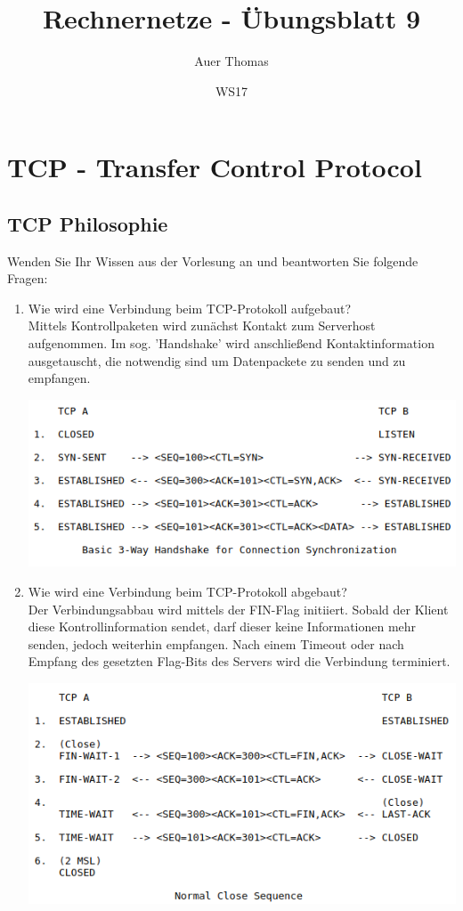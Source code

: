 \documentclass[11pt]{article}
\title{Rechnernetze - Übungsblatt 9}
\author{Auer Thomas}    %
\date{WS17}
\begin{document}
    \section{TCP - Transfer Control Protocol}
    \subsection{TCP Philosophie}
    Wenden Sie Ihr Wissen aus der Vorlesung an und beantworten Sie folgende Fragen:
    \begin{enumerate}[$\bullet$]
        \item Wie wird eine Verbindung beim TCP-Protokoll aufgebaut?\\
        Mittels Kontrollpaketen wird zunächst Kontakt zum Serverhost aufgenommen.
        Im sog. 'Handshake' wird anschließend Kontaktinformation ausgetauscht, die notwendig sind um Datenpackete zu
        senden und zu empfangen.

        \includegraphics[width=\textwidth]{graphics/TCPHandshake.png}

        \item Wie wird eine Verbindung beim TCP-Protokoll abgebaut?\\
        Der Verbindungsabbau wird mittels der FIN-Flag initiiert. Sobald der Klient diese Kontrollinformation sendet,
        darf dieser keine Informationen mehr senden, jedoch weiterhin empfangen.
        Nach einem Timeout oder nach Empfang des gesetzten Flag-Bits des Servers wird die Verbindung terminiert.

        \includegraphics[width=\textwidth]{graphics/TCPClose.png}


\end{enumerate}
\end{document}
